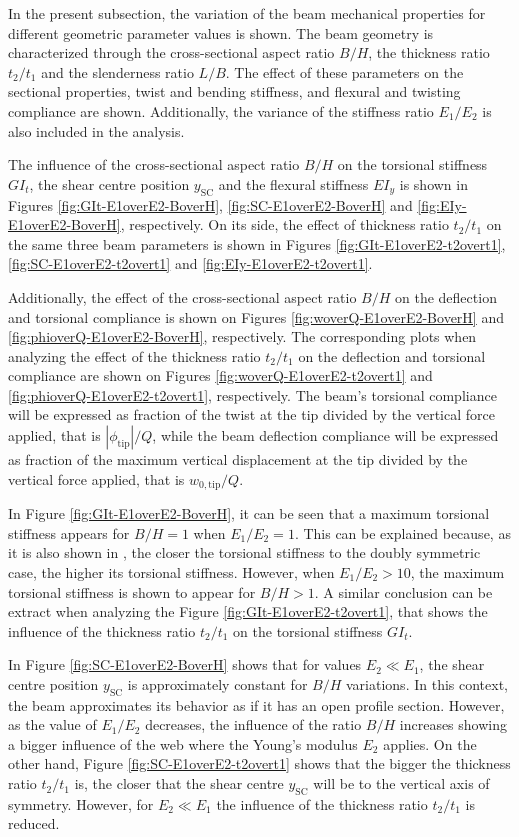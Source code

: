     In the present subsection, the variation of the beam mechanical properties for different geometric parameter values is shown. The beam geometry is characterized through the cross-sectional aspect ratio $B/H$, the thickness ratio $t_2/t_1$ and the slenderness ratio $L/B$. The effect of these parameters on the sectional properties, twist and bending stiffness, and flexural and twisting compliance are shown. Additionally, the variance of the stiffness ratio $E_1/E_2$ is also included in the analysis.

    The influence of the cross-sectional aspect ratio $B/H$ on the torsional stiffness $G I_t$, the shear centre position $y_{\mathrm{SC}}$ and the flexural stiffness $E I_y$ is shown in Figures \ref{fig:GIt-E1overE2-BoverH}, \ref{fig:SC-E1overE2-BoverH} and \ref{fig:EIy-E1overE2-BoverH}, respectively. On its side, the effect of thickness ratio $t_2/t_1$ on the same three beam parameters is shown in Figures \ref{fig:GIt-E1overE2-t2overt1}, \ref{fig:SC-E1overE2-t2overt1} and \ref{fig:EIy-E1overE2-t2overt1}.

    Additionally, the effect of the cross-sectional aspect ratio $B/H$ on the deflection and torsional compliance is shown on Figures \ref{fig:woverQ-E1overE2-BoverH} and \ref{fig:phioverQ-E1overE2-BoverH}, respectively. The corresponding plots when analyzing the effect of the thickness ratio $t_2/t_1$ on the deflection and torsional compliance are shown on Figures \ref{fig:woverQ-E1overE2-t2overt1} and \ref{fig:phioverQ-E1overE2-t2overt1}, respectively. The beam's torsional compliance will be expressed as fraction of the twist at the tip divided by the vertical force applied, that is $|\phi_{\mathrm{tip}}| / Q$, while the beam deflection compliance will be expressed as fraction of the maximum vertical displacement at the tip divided by the vertical force applied, that is $w_{\mathrm{0,tip}} / Q$.

    In Figure \ref{fig:GIt-E1overE2-BoverH}, it can be seen that a maximum torsional stiffness appears for $B/H = 1$ when $E_1/E_2 = 1$. This can be explained because, as it is also shown in \cite{Raither2013a}, the closer the torsional stiffness to the doubly symmetric case, the higher its torsional stiffness. However, when $E_1/E_2 > 10$, the maximum torsional stiffness is shown to appear for $B/H > 1$. A similar conclusion can be extract when analyzing the Figure \ref{fig:GIt-E1overE2-t2overt1}, that shows the influence of the thickness ratio $t_2/t_1$ on the torsional stiffness $G I_t$.

    In Figure \ref{fig:SC-E1overE2-BoverH} shows that for values $E_2 \ll E_1$, the shear centre position $y_{\mathrm{SC}}$ is approximately constant for $B/H$ variations. In this context, the beam approximates its behavior as if it has an open profile section. However, as the value of $E_1/E_2$ decreases, the influence of the ratio $B/H$ increases showing a bigger influence of the web where the Young's modulus $E_2$ applies. On the other hand, Figure \ref{fig:SC-E1overE2-t2overt1} shows that the bigger the thickness ratio $t_2/t_1$ is, the closer that the shear centre $y_{\mathrm{SC}}$ will be to the vertical axis of symmetry. However, for $E_2 \ll E_1$ the influence of the thickness ratio $t_2/t_1$ is reduced.

